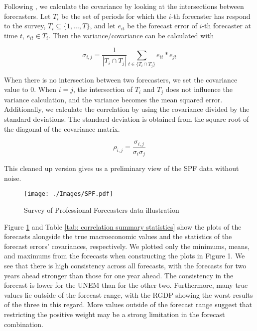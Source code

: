 \documentclass[11pt]{article}
\begin{document}
	Following \cite{Matsypura2018}, we calculate the covariance by looking at the intersections between forecasters. Let $T_i$ be the set of periods for which the $i$-th forecaster has respond to the survey, $T_i \subseteq \{1,\ldots,T\}$, and let $e_{it}$ be the forecast error of $i$-th forecaster at time $t$, $e_{it} \in T_i$. Then the variance/covariance can be calculated with 
	
	
	\begin{equation}
	\label{equation}
	\sigma_{i,j} = \frac{1}{|T_i \cap T_j|}\sum_{t\in \{T_i \cap T_j\}} e_{it}*e_{jt}
	\end{equation}
	
	When there is no intersection between two forecasters, we set the covariance value to 0. When $i=j$, the intersection of $T_i$ and $T_j$ does not influence the variance calculation, and the variance becomes the mean squared error. Additionally, we calculate the correlation by using the covariance divided by the standard deviations. The standard deviation is obtained from the square root of the diagonal of the covariance matrix.
	
	\begin{equation}
	\label{eqn: cov2cor}
	\rho_{i,j} = \frac{\sigma_{i,j}}{\sigma_{i}\sigma_{j}}
	\end{equation}
	
	This cleaned up version gives us a preliminary view of the SPF data without noise.
	
	\begin{figure}[!h]
		\centering
		\texttt{[image: ./Images/SPF.pdf]}
		\caption{Survey of Professional Forecasters data illustration}\label{fig: SPF data illustration}
	\end{figure}
	
	Figure \ref{fig: SPF data illustration} and Table \ref{tab: correlation summary statistics} show the plots of the forecasts alongside the true macroeconomic values and the statistics of the forecast errors' covariances, respectively. We plotted only the minimums, means, and maximums from the forecasts when constructing the plots in Figure 1. We see that there is high consistency across all forecasts, with the forecasts for two years ahead stronger than those for one year ahead. The consistency in the forecast is lower for the UNEM than for the other two. Furthermore, many true values lie outside of the forecast range, with the RGDP showing the worst results of the three in this regard. More values outside of the forecast range suggest that restricting the positive weight may be a strong limitation in the forecast combination.
	
\end{document}
